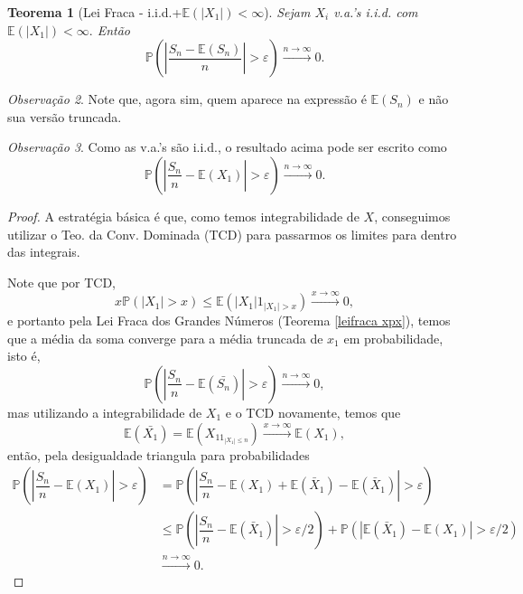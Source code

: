 \documentclass[12pt,a4paper,oneside]{book}
\newtheorem{theorem}{Teorema}[section]
\theoremstyle{definition}
\theoremstyle{remark}
\newtheorem{remark}[theorem]{Observa\c{c}\~ao}
\numberwithin{equation}{section}
\newcommand{\e}{\varepsilon}
\newcommand{\E}{\mathbb{E}}
\newcommand{\pr}{\mathbb{P}}
\newcommand{\rarrowlimn}{\xrightarrow{n\rightarrow \infty}}
\begin{document}
\begin{tcolorbox}

\begin{theorem}[Lei Fraca  - i.i.d.+$\E(|X_1|)<\infty$]\label{leifracaEX<infinito} Sejam $X_i$ v.a.'s i.i.d. com $\E(|X_1|)<\infty.$
Então
$$\pr\left(\left|\dfrac{S_n-\E(S_n)}{n}\right|>\e \right) \xrightarrow{n\rightarrow \infty}0.$$
\end{theorem}

\end{tcolorbox}
\begin{tcolorbox}[colback = yellow!60]
\begin{remark}
Note que, agora sim, quem aparece na expressão é $\E(S_n)$ e não sua versão truncada.
\end{remark}

\end{tcolorbox}

\begin{tcolorbox}[colback = yellow!60]
\begin{remark}
Como as v.a.'s são i.i.d., o resultado acima pode ser escrito como
$$\pr\left(\left|\dfrac{S_n}{n}-\E(X_1)\right|>\e \right) \xrightarrow{n\rightarrow \infty}0.$$
\end{remark}

\end{tcolorbox}

\begin{proof}
A estratégia básica é que, como temos integrabilidade de $X$, conseguimos utilizar o Teo. da Conv. Dominada (TCD) para passarmos os limites para dentro das integrais.

Note que por TCD,
$$x\pr(|X_1|>x)\leq \E(|X_1|1_{|X_1|>x}) \xrightarrow{x\rightarrow \infty} 0 ,$$
e portanto pela Lei Fraca dos Grandes Números (Teorema \ref{leifraca xpx}),
temos que a média da soma converge para a média truncada de $x_1$ em probabilidade, isto é,
$$\pr\left(\left|\dfrac{S_n}{n}-\E(\bar{S_n})\right|>\e \right) \xrightarrow{n\rightarrow \infty}0,$$
mas utilizando a integrabilidade de $X_1$ e o TCD novamente, temos que
$$\E(\bar{X_1}) = \E(X_11_{|X_1|\leq n})\xrightarrow{x\rightarrow \infty} \E(X_1),$$
então, pela desigualdade triangula para probabilidades
\begin{align*}
\pr\left(\left|\dfrac{S_n}{n}-\E(X_1)\right|>\e \right)&= \pr\left(\left|\dfrac{S_n}{n}-\E(X_1)+\E(\bar{X}_1)-\E(\bar{X}_1)\right|>\e \right) \\
&\leq \pr\left(\left|\dfrac{S_n}{n}-\E(\bar{X}_1)\right|>\e/2 \right)+\pr\left(\left|\E(\bar{X}_1)-\E(X_1)\right|>\e/2 \right)\\
&\rarrowlimn 0.
\end{align*}

 \end{proof}
\end{document}
